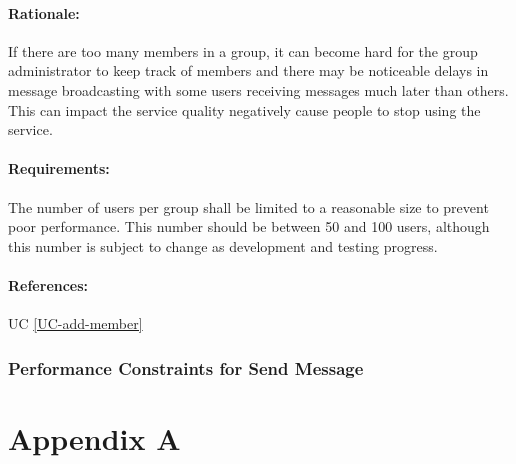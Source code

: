 \documentclass[11pt]{article}
\begin{document}
\paragraph{Rationale:} If there are too many members in a group, it can become hard for the group administrator to keep track of members and there may be noticeable delays in message broadcasting with some users receiving messages much later than others. This can impact the service quality negatively cause people to stop using the service.
\paragraph{Requirements:} The number of users per group shall be limited to a reasonable size to prevent poor performance. This number should be between 50 and 100 users, although this number is subject to change as development and testing progress.
\paragraph{References:} UC \ref{UC-add-member}

\subsubsection{Performance Constraints for Send Message}


\newpage
\section{Appendix A} \label{appendix-a}
\listoffigures
\end{document}
